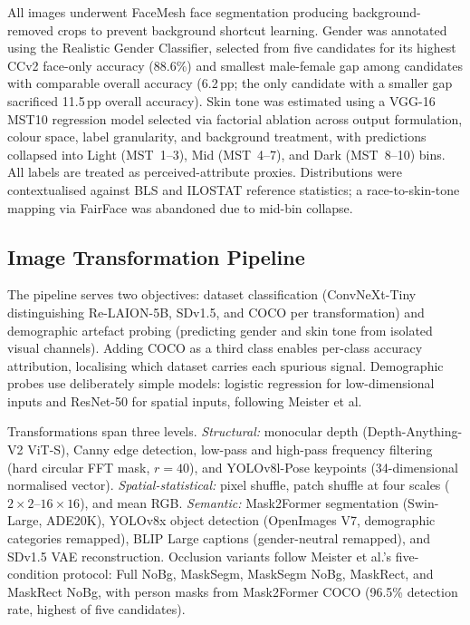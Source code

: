 All images underwent FaceMesh face segmentation producing background-removed crops to
prevent background shortcut learning. Gender was annotated using the Realistic Gender
Classifier, selected from five candidates for its highest CCv2 face-only accuracy
(88.6\%) and smallest male-female gap among candidates with comparable overall accuracy
(6.2\,pp; the only candidate with a smaller gap sacrificed 11.5\,pp overall accuracy).
Skin tone was estimated using a VGG-16 MST10 regression model selected via factorial
ablation across output formulation, colour space, label granularity, and background
treatment, with predictions collapsed into Light (MST~1--3), Mid (MST~4--7), and Dark
(MST~8--10) bins. All labels are treated as perceived-attribute proxies. Distributions
were contextualised against BLS and ILOSTAT reference statistics; a race-to-skin-tone
mapping via FairFace was abandoned due to mid-bin collapse.

\subsection{Image Transformation Pipeline}

The pipeline serves two objectives: dataset classification (ConvNeXt-Tiny distinguishing
Re-LAION-5B, SDv1.5, and COCO per transformation) and demographic artefact probing
(predicting gender and skin tone from isolated visual channels). Adding COCO as a third
class enables per-class accuracy attribution, localising which dataset carries each
spurious signal. Demographic probes use deliberately simple models: logistic regression
for low-dimensional inputs and ResNet-50 for spatial inputs, following Meister et al.

Transformations span three levels. \textit{Structural:} monocular depth (Depth-Anything-V2
ViT-S), Canny edge detection, low-pass and high-pass frequency filtering (hard circular
FFT mask, $r{=}40$), and YOLOv8l-Pose keypoints (34-dimensional normalised vector).
\textit{Spatial-statistical:} pixel shuffle, patch shuffle at four scales
($2{\times}2$--$16{\times}16$), and mean RGB. \textit{Semantic:} Mask2Former
segmentation (Swin-Large, ADE20K), YOLOv8x object detection (OpenImages V7, demographic
categories remapped), BLIP Large captions (gender-neutral remapped), and SDv1.5 VAE
reconstruction. Occlusion variants follow Meister et al.'s five-condition protocol: Full
NoBg, MaskSegm, MaskSegm NoBg, MaskRect, and MaskRect NoBg, with person masks from
Mask2Former COCO (96.5\% detection rate, highest of five candidates).

